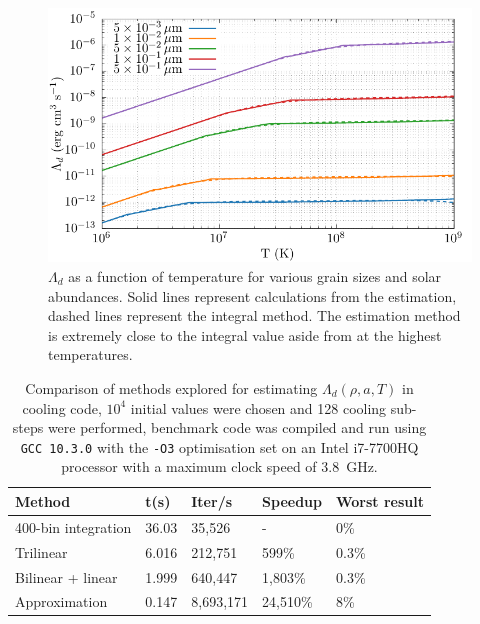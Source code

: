 \begin{figure}[ht]
  \centering
  \includegraphics{assets/grain-transparency/lambda-comp.pdf}
  \caption[Electron transparency method accuracy - $\Lambda_d$]{$\Lambda_d$ as a function of temperature for various grain sizes and solar abundances. Solid lines represent calculations from the \textcite{dwek_infrared_1981} estimation, dashed lines represent the integral method. The estimation method is extremely close to the integral value aside from at the highest temperatures.}
  \label{fig:lambda-comp-int-vs-est}
\end{figure}

\begin{table}[ht]
  \centering
  \begin{tabular}{lllll}
    \hline
    Method & t(s) & Iter/s & Speedup & Worst result \\ \hline
    400-bin integration & 36.03 & 35,526 & - & 0\% \\
    Trilinear & 6.016 & 212,751 & 599\% & 0.3\% \\
    Bilinear + linear & 1.999 & 640,447 & 1,803\% & 0.3\% \\
    Approximation & 0.147 & 8,693,171 & 24,510\% & 8\% \\ \hline
  \end{tabular}
  \caption[Dust cooling calculation comparison]{Comparison of methods explored for estimating $\Lambda_d(\rho,a,T)$ in cooling code, $10^4$ initial values were chosen and 128 cooling sub-steps were performed, benchmark code was compiled and run using \texttt{GCC 10.3.0} with the \texttt{-O3} optimisation set on an Intel i7-7700HQ processor with a maximum clock speed of \SI{3.8}{\giga\hertz}.}
  \label{tab:electron-speedup}
\end{table}

